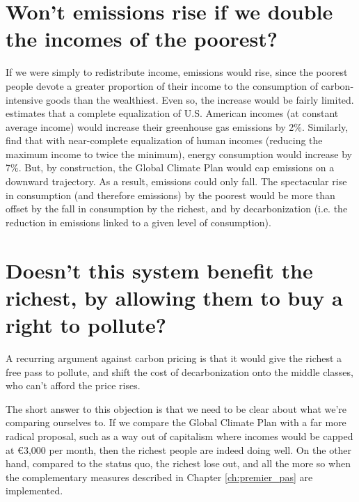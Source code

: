 \documentclass[a5paper,english,openany]{memoir}
\begin{document}
\section*{\normalsize Won't emissions rise if we double the incomes of the poorest?}\label{q:emissions}

If we were simply to redistribute income, emissions would rise, since the poorest people devote a greater proportion of their income to the consumption of carbon-intensive goods than the wealthiest. Even so, the increase would be fairly limited. \cite{sager_income_2019} estimates that a complete equalization of U.S. American incomes (at constant average income) would increase their greenhouse gas emissions by 2\%. Similarly, \cite{oswald_global_2021} find that with near-complete equalization of human incomes (reducing the maximum income to twice the minimum), energy consumption would increase by 7\%. 
But, by construction, the Global Climate Plan would cap emissions on a downward trajectory. As a result, emissions could only fall. The spectacular rise in consumption (and therefore emissions) by the poorest would be more than offset by the fall in consumption by the richest, and by decarbonization (i.e. the reduction in emissions linked to a given level of consumption).

\section*{\normalsize Doesn't this system benefit the richest, by allowing them to buy a right to pollute?}\label{q:riches}

A recurring argument against carbon pricing is that it would give the richest a free pass to pollute, and shift the cost of decarbonization onto the middle classes, who can't afford the price rises. 

The short answer to this objection is that we need to be clear about what we're comparing ourselves to. If we compare the Global Climate Plan with a far more radical proposal, such as a way out of capitalism where incomes would be capped at \euro{}3,000 per month, then the richest people are indeed doing well. On the other hand, compared to the status quo, the richest lose out, and all the more so when the complementary measures described in Chapter \ref{ch:premier_pas} are implemented. 
\end{document}
